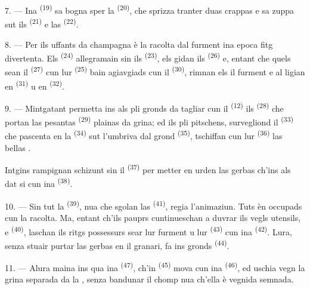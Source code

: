 7. --- Ina  \textsuperscript{(19)} sa bogna sper la 
\textsuperscript{(20)}, che sprizza tranter duas crappas e sa zuppa sut ils
 \textsuperscript{(21)} e las 
\textsuperscript{(22)}.

\VUsaut{5.0mm}
\VUsaut{3.4mm}

8. --- Per ils uffants da champagna è la racolta dal furment ina epoca fitg
divertenta. Els \textsuperscript{(24)} allegramain sin ils
 \textsuperscript{(23)}, els gidan ils 
\textsuperscript{(26)} e, entant che quels sean il 
\textsuperscript{(27)} cun lur  \textsuperscript{(25)} bain agiavgiads
cun il  \textsuperscript{(30)}, rimnan els il furment e al ligian en
 \textsuperscript{(31)} u en  \textsuperscript{(32)}.

9. --- Mintgatant permetta ins als pli gronds da tagliar cun il 
\textsuperscript{(12)} ils  \textsuperscript{(28)} che portan las
pesantas  \textsuperscript{(29)} plainas da grina; ed ils pli pitschens,
survegliond il  \textsuperscript{(33)} che pascenta en la 
\textsuperscript{(34)} sut l'umbriva dal grond  \textsuperscript{(35)},
tschiffan cun lur  \textsuperscript{(36)} las bellas .

Intgins rampignan schizunt sin il  \textsuperscript{(37)} per metter en
urden las gerbas ch'ins als dat si cun ina  \textsuperscript{(38)}.

10. --- Sin tut la  \textsuperscript{(39)}, nua che sgolan las
 \textsuperscript{(41)}, regia l'animaziun. Tuts èn occupads cun la
racolta. Ma, entant ch'ils pauprs cuntinueschan a duvrar ils vegls utensils,
 e  \textsuperscript{(40)}, laschan ils
ritgs possessurs sear lur furment u lur  \textsuperscript{(43)} cun ina
 \textsuperscript{(42)}. Lura, senza stuair purtar las gerbas en
il granari, fa ins gronds  \textsuperscript{(44)}.

11. --- Alura maina ins qua ina  \textsuperscript{(47)}, ch'in
 \textsuperscript{(45)} mova cun ina 
\textsuperscript{(46)}, ed uschia vegn la grina separada da la , senza
bandunar il chomp nua ch'ella è vegnida semnada.

